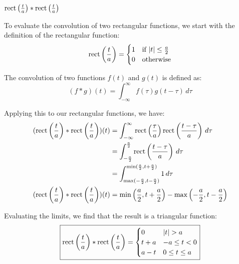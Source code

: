 \documentclass[a4paper, 10pt]{article}
\begin{document}
\newpage

\begin{subproblems}[resume]
    \item \( \textrm{rect} \left( \frac{t}{a} \right) * \textrm{rect} \left( \frac{t}{a} \right) \)
\end{subproblems}

\begin{solution}
To evaluate the convolution of two rectangular functions, we start with the definition of the rectangular function:
\[ \textrm{rect} \left( \frac{t}{a} \right) = \begin{cases} 1 & \text{if } |t| \leq \frac{a}{2} \\ 0 & \text{otherwise} \end{cases} \]

The convolution of two functions \( f(t) \) and \( g(t) \) is defined as:
\[ (f * g)(t) = \int_{-\infty}^{\infty} f(\tau) g(t - \tau) \, d\tau \]

Applying this to our rectangular functions, we have:
\[
\begin{aligned}
    ( \textrm{rect} \left( \frac{t}{a} \right) * \textrm{rect} \left( \frac{t}{a} \right) )(t) &= \int_{-\infty}^{\infty} \textrm{rect} \left( \frac{\tau}{a} \right) \textrm{rect} \left( \frac{t - \tau}{a} \right) \, d\tau \\
    &= \int_{-\frac{a}{2}}^{\frac{a}{2}} \textrm{rect} \left( \frac{t - \tau}{a} \right) \, d\tau \\
    &= \int_{\max(-\frac{a}{2}, t - \frac{a}{2})}^{\min(\frac{a}{2}, t + \frac{a}{2})} 1 \, d\tau \\
    ( \textrm{rect} \left( \frac{t}{a} \right) * \textrm{rect} \left( \frac{t}{a} \right) )(t) &= \min\left(\frac{a}{2}, t + \frac{a}{2}\right) - \max\left(-\frac{a}{2}, t - \frac{a}{2}\right)
\end{aligned}
\]

Evaluating the limits, we find that the result is a triangular function:
\[ \boxed{ \textrm{rect} \left( \frac{t}{a} \right) * \textrm{rect} \left( \frac{t}{a} \right) = \begin{cases} 
    0 & |t| > a \\
    t + a & -a \leq t < 0 \\
    a - t & 0 \leq t \leq a
\end{cases} } \]


\end{solution}
\end{document}
